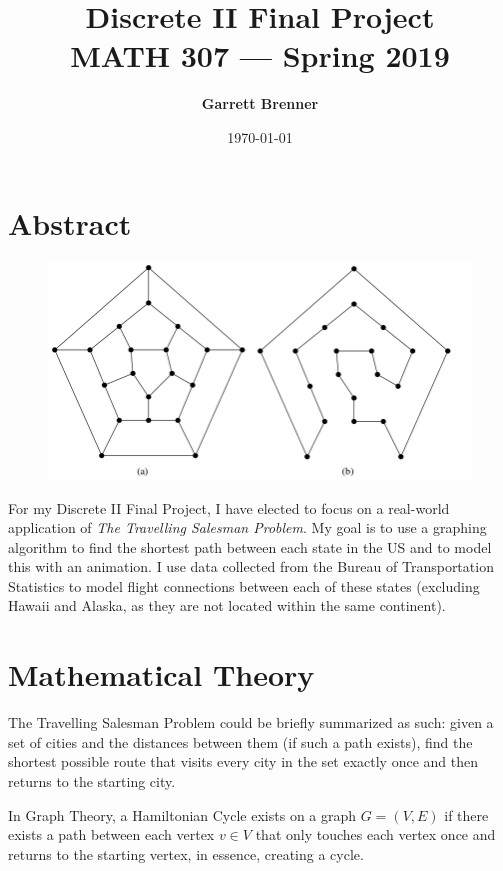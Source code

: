 \documentclass[12pt]{article}
\title{\bf Discrete II Final Project\\[2ex] 
       \rm\normalsize MATH 307 --- Spring 2019}
\date{\today}
\author{\bf Garrett Brenner}
\begin{document}
\maketitle

\pagebreak

\section*{Abstract}

\begin{figure}[h]
\includegraphics[scale=.5]{HamiltonCycle}
\centering
\end{figure}

For my Discrete II Final Project, I have elected to focus on a real-world
application of \textit{The Travelling Salesman Problem}. My goal is to use
a graphing algorithm to find the shortest path between each state in the US
and to model this with an animation. I use data collected from the Bureau 
of Transportation Statistics to model flight connections between each of 
these states (excluding Hawaii and Alaska, as they are not located within the
same continent).

\section*{Mathematical Theory} 

The Travelling Salesman Problem could be briefly summarized as such: given
a set of cities and the distances between them (if such a path exists),
find the shortest possible route that visits every city in the set exactly
once and then returns to the starting city.

In Graph Theory, a Hamiltonian Cycle exists on a graph \(G = (V,E)\) if 
there exists a path between each vertex \(v \in V\) that only touches
each vertex once and returns to the starting vertex, in essence, creating
a cycle.
\end{document}
